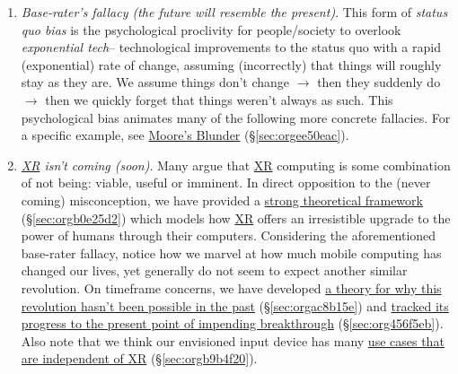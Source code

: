 \documentclass[logo,bsc,singlespacing,parskip]{infthesis}
\begin{document}
\begin{enumerate}
\item \emph{Base-rater's fallacy (the future will resemble the present)}.
This form of \emph{status quo bias} is the psychological proclivity for people/society to overlook \emph{exponential tech}-- technological improvements to the status quo with a rapid (exponential) rate of change, assuming (incorrectly) that things will roughly stay as they are.
We assume things don't change \(\rightarrow\) then they suddenly do \(\rightarrow\) then we quickly forget that things weren't always as such.
This psychological bias animates many of the following more concrete fallacies.
For a specific example, see \hyperref[sec:orgee50eac]{Moore's Blunder} (\S \ref{sec:orgee50eac}).

\item \emph{\hyperref[orgf7f8e78]{XR} isn't coming (soon)}.
Many argue that \hyperref[orgf7f8e78]{XR} computing is some combination of not being: viable, useful or imminent.
In direct opposition to the (never coming) misconception, we have provided a \hyperref[sec:orgb0e25d2]{strong theoretical framework} (\S \ref{sec:orgb0e25d2}) which models how \hyperref[orgf7f8e78]{XR} offers an irresistible upgrade to the power of humans through their computers.
Considering the aforementioned base-rater fallacy, notice how we marvel at how much mobile computing has changed our lives, yet generally do not seem to expect another similar revolution.
On timeframe concerns, we have developed \hyperref[sec:orgac8b15e]{a theory for why this revolution hasn't been possible in the past} (\S \ref{sec:orgac8b15e}) and \hyperref[sec:org456f5eb]{tracked its progress to the present point of impending breakthrough} (\S \ref{sec:org456f5eb}).
Also note that we think our envisioned input device has many \hyperref[sec:orgb9b4f20]{use cases that are independent of XR} (\S \ref{sec:orgb9b4f20}).


\end{enumerate}
\end{document}
